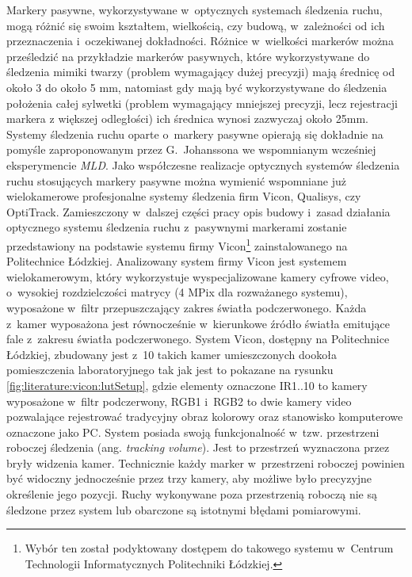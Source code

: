 Markery pasywne, wykorzystywane w~optycznych systemach śledzenia ruchu, mogą różnić się swoim kształtem, wielkością, czy budową, w~zależności od ich przeznaczenia i~oczekiwanej dokładności. Różnice w~wielkości markerów można prześledzić na przykładzie markerów pasywnych, które wykorzystywane do śledzenia mimiki twarzy (problem wymagający dużej precyzji) mają średnicę od około 3 do około 5 mm, natomiast gdy mają być wykorzystywane do śledzenia położenia całej sylwetki (problem wymagający mniejszej precyzji, lecz rejestracji markera z większej odległości) ich średnica wynosi zazwyczaj około 25mm{}. Systemy śledzenia ruchu oparte o~markery pasywne opierają się dokładnie na pomyśle zaproponowanym przez G.~Johanssona we wspomnianym wcześniej eksperymencie \textsl{MLD}. Jako współczesne realizacje optycznych systemów śledzenia ruchu stosujących markery pasywne można wymienić wspomniane już wielokamerowe profesjonalne systemy śledzenia firm Vicon, Qualisys, czy OptiTrack. 
Zamieszczony w~dalszej części pracy opis budowy i~zasad działania optycznego systemu śledzenia ruchu z~pasywnymi markerami zostanie przedstawiony na podstawie systemu firmy Vicon\footnote{Wybór ten został podyktowany dostępem do takowego systemu w~Centrum Technologii Informatycznych Politechniki Łódzkiej.} zainstalowanego na Politechnice Łódzkiej. 
Analizowany system firmy Vicon jest systemem wielokamerowym, który wykorzystuje wyspecjalizowane kamery cyfrowe video, o~wysokiej rozdzielczości matrycy (4 MPix dla rozważanego systemu), wyposażone w~filtr przepuszczający zakres światła podczerwonego. Każda z~kamer wyposażona jest równocześnie w~kierunkowe źródło światła emitujące fale z~zakresu światła podczerwonego. System Vicon, dostępny na Politechnice Łódzkiej, zbudowany jest z~10 takich kamer umieszczonych dookoła pomieszczenia laboratoryjnego tak jak jest to pokazane na rysunku \ref{fig:literature:vicon:lutSetup}, gdzie elementy oznaczone IR1..10 to kamery wyposażone w~filtr podczerwony, RGB1 i~RGB2 to dwie kamery video pozwalające rejestrować tradycyjny obraz kolorowy oraz stanowisko komputerowe oznaczone jako PC. System posiada swoją funkcjonalność w~tzw. przestrzeni roboczej śledzenia (ang. \textsl{tracking volume}). Jest to przestrzeń wyznaczona przez bryły widzenia kamer. Technicznie każdy marker w~przestrzeni roboczej powinien być widoczny jednocześnie przez trzy kamery, aby możliwe było precyzyjne określenie jego pozycji. Ruchy wykonywane poza przestrzenią roboczą nie są śledzone przez system lub obarczone są istotnymi błędami pomiarowymi.

